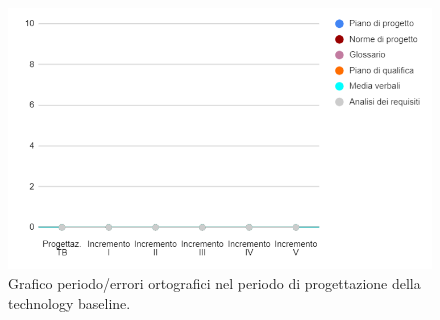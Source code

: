 \begin{figure}[H]
	\centering
	\includegraphics[width=0.8\linewidth]{./res/images/ortografia_2.png}
	\caption{Grafico periodo/errori ortografici nel periodo di progettazione della technology baseline.}
	\label{fig:Grafico errori ortografici durante il periodo di progettazione della technology baseline.}
\end{figure}
